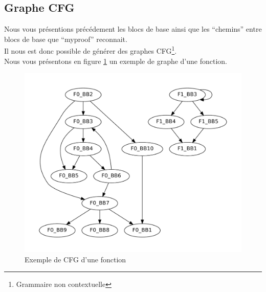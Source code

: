 \subsection{Graphe CFG}

Nous vous présentions précédement les blocs de base ainsi que les ``chemins'' entre blocs de base que ``myproof'' reconnait.\\

Il nous est donc possible de générer des graphes CFG\footnote{Grammaire non contextuelle}.\\

Nous vous présentons en figure \ref{fig:cfg} un exemple de graphe d'une fonction.

\begin{figure}[here]
  \centering
  \includegraphics[scale=0.50]{images/t-test.pdf}
  \caption{Exemple de CFG d'une fonction}
  \label{fig:cfg}
\end{figure}
